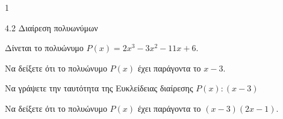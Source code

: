 \begin{ylh}{1}
\item 4.2 Διαίρεση πολυωνύμων
\end{ylh}
Δίνεται το πολυώνυμο $P(x) = 2x^3 - 3x^2 - 11x + 6$.
\begin{alist}
\item
\begin{rlist}
\item Να δείξετε ότι το πολυώνυμο $P(x)$ έχει παράγοντα το $x - 3$.
\item Να γράψετε την ταυτότητα της Ευκλείδειας διαίρεσης $P(x) : (x - 3)$
\end{rlist}
\item Να δείξετε ότι το πολυώνυμο $P(x)$ έχει παράγοντα το $(x - 3)(2x - 1)$.
\end{alist}

